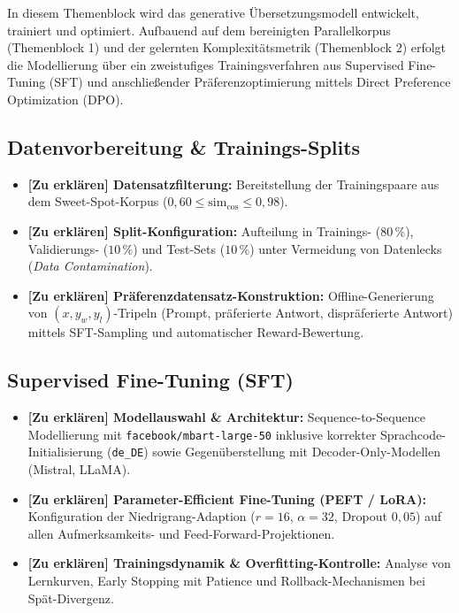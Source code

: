 In diesem Themenblock wird das generative Übersetzungsmodell entwickelt, trainiert und optimiert. Aufbauend auf dem bereinigten Parallelkorpus (Themenblock 1) und der gelernten Komplexitätsmetrik (Themenblock 2) erfolgt die Modellierung über ein zweistufiges Trainingsverfahren aus Supervised Fine-Tuning (SFT) und anschließender Präferenzoptimierung mittels Direct Preference Optimization (DPO).

\subsection{Datenvorbereitung \& Trainings-Splits}
\label{sec:daten_splits_dpo}
\begin{tcolorbox}[colback=red!5!white,colframe=red!75!black,title=\textbf{Zu erklären in diesem Abschnitt:},sharp corners,boxrule=0.8pt]
\color{red!80!black}
\begin{itemize}
    \item \textbf{[Zu erklären] Datensatzfilterung:} Bereitstellung der Trainingspaare aus dem Sweet-Spot-Korpus ($0{,}60 \le \text{sim}_{\cos} \le 0{,}98$).
    \item \textbf{[Zu erklären] Split-Konfiguration:} Aufteilung in Trainings- ($80\,\%$), Validierungs- ($10\,\%$) und Test-Sets ($10\,\%$) unter Vermeidung von Datenlecks (\textit{Data Contamination}).
    \item \textbf{[Zu erklären] Präferenzdatensatz-Konstruktion:} Offline-Generierung von $(x, y_w, y_l)$-Tripeln (Prompt, präferierte Antwort, dispräferierte Antwort) mittels SFT-Sampling und automatischer Reward-Bewertung.
\end{itemize}
\end{tcolorbox}

\subsection{Supervised Fine-Tuning (SFT)}
\label{sec:sft_training}
\begin{tcolorbox}[colback=red!5!white,colframe=red!75!black,title=\textbf{Zu erklären in diesem Abschnitt:},sharp corners,boxrule=0.8pt]
\color{red!80!black}
\begin{itemize}
    \item \textbf{[Zu erklären] Modellauswahl \& Architektur:} Sequence-to-Sequence Modellierung mit \texttt{facebook/mbart-large-50} inklusive korrekter Sprachcode-Initialisierung (\texttt{de\_DE}) sowie Gegenüberstellung mit Decoder-Only-Modellen (Mistral, LLaMA).
    \item \textbf{[Zu erklären] Parameter-Efficient Fine-Tuning (PEFT / LoRA):} Konfiguration der Niedrigrang-Adaption ($r=16$, $\alpha=32$, Dropout $0{,}05$) auf allen Aufmerksamkeits- und Feed-Forward-Projektionen.
    \item \textbf{[Zu erklären] Trainingsdynamik \& Overfitting-Kontrolle:} Analyse von Lernkurven, Early Stopping mit Patience und Rollback-Mechanismen bei Spät-Divergenz.
\end{itemize}
\end{tcolorbox}

